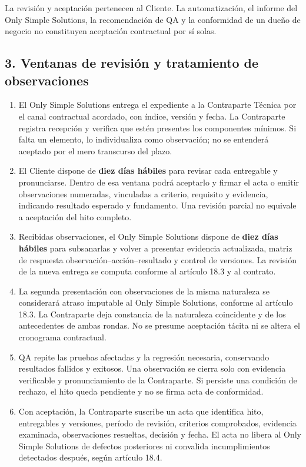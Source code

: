 \documentclass[11pt]{article}
\providecommand{\tightlist}{%
  \setlength{\itemsep}{0pt}\setlength{\parskip}{0pt}}
\begin{document}
La revisión y aceptación pertenecen al Cliente. La automatización, el informe del Only Simple Solutions, la recomendación de QA y la conformidad de un dueño de negocio no constituyen aceptación contractual por sí solas.

\subsection{3. Ventanas de revisión y tratamiento de observaciones}\label{t17-ventanas-de-revisiuxf3n-y-tratamiento-de-observaciones}

\begin{enumerate}
\def\labelenumi{\arabic{enumi}.}
\tightlist
\item
  El Only Simple Solutions entrega el expediente a la Contraparte Técnica por el canal contractual acordado, con índice, versión y fecha. La Contraparte registra recepción y verifica que estén presentes los componentes mínimos. Si falta un elemento, lo individualiza como observación; no se entenderá aceptado por el mero transcurso del plazo.
\item
  El Cliente dispone de \textbf{diez días hábiles} para revisar cada entregable y pronunciarse. Dentro de esa ventana podrá aceptarlo y firmar el acta o emitir observaciones numeradas, vinculadas a criterio, requisito y evidencia, indicando resultado esperado y fundamento. Una revisión parcial no equivale a aceptación del hito completo.
\item
  Recibidas observaciones, el Only Simple Solutions dispone de \textbf{diez días hábiles} para subsanarlas y volver a presentar evidencia actualizada, matriz de respuesta observación--acción--resultado y control de versiones. La revisión de la nueva entrega se computa conforme al artículo 18.3 y al contrato.
\item
  La segunda presentación con observaciones de la misma naturaleza se considerará atraso imputable al Only Simple Solutions, conforme al artículo 18.3. La Contraparte deja constancia de la naturaleza coincidente y de los antecedentes de ambas rondas. No se presume aceptación tácita ni se altera el cronograma contractual.
\item
  QA repite las pruebas afectadas y la regresión necesaria, conservando resultados fallidos y exitosos. Una observación se cierra solo con evidencia verificable y pronunciamiento de la Contraparte. Si persiste una condición de rechazo, el hito queda pendiente y no se firma acta de conformidad.
\item
  Con aceptación, la Contraparte suscribe un acta que identifica hito, entregables y versiones, período de revisión, criterios comprobados, evidencia examinada, observaciones resueltas, decisión y fecha. El acta no libera al Only Simple Solutions de defectos posteriores ni convalida incumplimientos detectados después, según artículo 18.4.
\end{enumerate}
\end{document}
